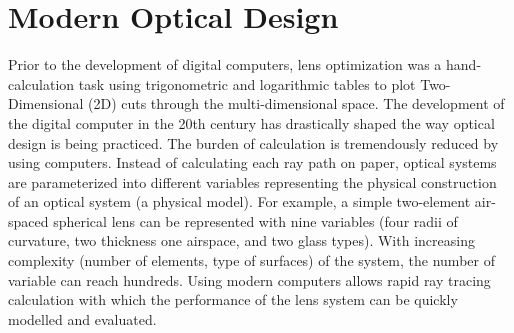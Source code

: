 \section{Modern Optical Design}
\vspace{1em}
Prior to the development of digital computers, lens optimization was a hand-calculation task using trigonometric and logarithmic tables to plot Two-Dimensional (2D) cuts through the multi-dimensional space. The development of the digital computer in the 20th century has drastically shaped the way optical design is being practiced. The burden of calculation is tremendously reduced by using computers. Instead of calculating each ray path on paper,  optical systems are parameterized into different variables representing the physical construction of an optical system (a physical model). For example, a simple two-element air-spaced spherical lens can be represented with nine variables (four radii of curvature, two thickness one airspace, and two glass types). With increasing complexity (number of elements, type of surfaces) of the system, the number of variable can reach hundreds. Using modern computers allows rapid ray tracing calculation with which the performance of the lens system can be quickly modelled and evaluated. 

